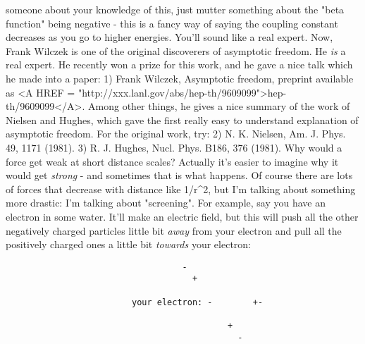someone about your knowledge of this, just mutter something about 
the "beta function" being negative - this is a fancy way of saying 
the coupling constant decreases as you go to higher energies.  You'll 
sound like a real expert.
Now, Frank Wilczek is one of the original discoverers of asymptotic
freedom.  He \emph{is} a real expert.  He recently won a prize for this work,
and he gave a nice talk which he made into a paper:
1) Frank Wilczek, Asymptotic freedom, preprint available as
<A HREF = "http://xxx.lanl.gov/abs/hep-th/9609099">hep-th/9609099</A>.
Among other things, he gives a nice summary of the work of Nielsen
and Hughes, which gave the first really easy to understand explanation
of asymptotic freedom.  For the original work, try:
2) N. K. Nielsen, Am. J. Phys. 49, 1171 (1981).
3) R. J. Hughes, Nucl. Phys. B186, 376 (1981). 
Why would a force get weak at short distance scales?  Actually it's
easier to imagine why it would get \emph{strong} - and sometimes that is
what happens.  Of course there are lots of forces that decrease with
distance like 1/r^2, but I'm talking about something more drastic: I'm
talking about "screening".
For example, say you have an electron in some water.  It'll make an
electric field, but this will push all the other negatively charged
particles little bit \emph{away} from your electron and pull all the
positively charged ones a little bit \emph{towards} your electron:
\begin{verbatim}
                                   -
                                     +

                         your electron: -        +-
 
                                            +
                                              -
                      
\end{verbatim}
    
